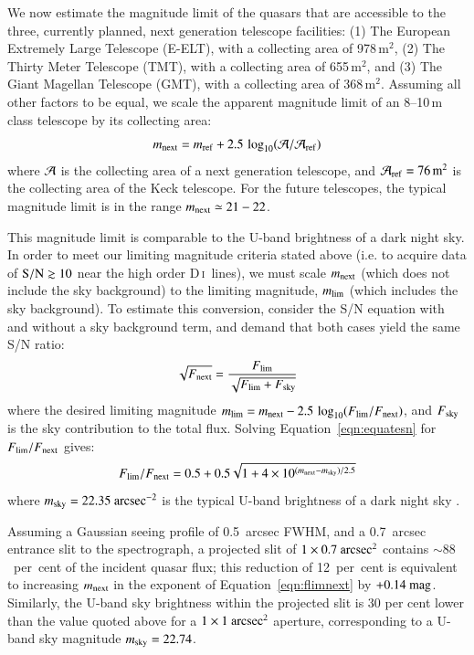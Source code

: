 \documentclass[12pt,preprint,useAMS,usenatbib]{emulateapj}
\newcommand{\DI}{\textrm{D}\,\textsc{i}}
\begin{document}
\begin{appendix}
We now estimate the magnitude limit of the quasars that
are accessible to the three, currently planned,
next generation telescope facilities:
(1) The European Extremely Large Telescope (E-ELT),
with a collecting area of 978\,m$^{2}$,
(2) The Thirty Meter Telescope (TMT),
with a collecting area of 655\,m$^{2}$, and
(3) The Giant Magellan Telescope (GMT),
with a collecting area of 368\,m$^{2}$.
Assuming all other factors to be equal, we scale
the apparent magnitude limit of an 8--10\,m
class telescope by its collecting area:
\begin{equation}
\label{eqn:apgain}
m_{\rm next}=m_{\rm ref} + 2.5\,\log_{10}({\cal A}/{\cal A}_{\rm ref})
\end{equation}
where ${\cal A}$ is the collecting area of a next generation
telescope, and ${\cal A}_{\rm ref}=76\,{\rm m}^{2}$
is the collecting area of the Keck telescope.
For the future telescopes, the typical magnitude
limit is in the range $m_{\rm next}\simeq21 - 22$.

This magnitude limit is comparable to the U-band brightness
of a dark night sky. In order to meet our limiting magnitude
criteria stated above (i.e. to acquire data of ${\rm S/N}\gtrsim10$
near the high order \DI\ lines), we must scale $m_{\rm next}$ (which
does not include the sky background) to the limiting magnitude,
$m_{\rm lim}$ (which includes the sky background). To estimate
this conversion, consider the S/N equation with and without a sky
background term, and demand that both cases yield the same
S/N ratio:
\begin{equation}
\label{eqn:equatesn}
\sqrt{F_{\rm next}} = \frac{F_{\rm lim}}{\sqrt{F_{\rm lim}+F_{\rm sky}}}
\end{equation}
where the desired limiting magnitude
$m_{\rm lim} = m_{\rm next} - 2.5\,\log_{10}(F_{\rm lim}/F_{\rm next})$,
and $F_{\rm sky}$ is the sky contribution to the total flux. Solving
Equation~\ref{eqn:equatesn} for $F_{\rm lim}/F_{\rm next}$ gives:
\begin{equation}
\label{eqn:flimnext}
F_{\rm lim}/F_{\rm next} = 0.5 + 0.5\sqrt{1+ 4\times10^{(m_{\rm next}-m_{\rm sky})/2.5}}
\end{equation}
where $m_{\rm sky}=22.35~{\rm arcsec}^{-2}$ is the typical U-band brightness
of a dark night sky \citep[e.g.][]{Pat08}.

Assuming a Gaussian seeing profile of 0.5~arcsec FWHM, and
a 0.7~arcsec entrance slit to the spectrograph, a projected slit
of $1\times0.7~{\rm arcsec}^{2}$ contains $\sim88$~per~cent
of the incident quasar flux; this reduction of 12~per~cent is
equivalent to increasing $m_{\rm next}$ in the exponent of
Equation~\ref{eqn:flimnext} by $+0.14~{\rm mag}$.
Similarly, the U-band sky brightness within the projected slit is
30 per cent lower than the value quoted above for a
$1\times1~{\rm arcsec}^{2}$ aperture,
corresponding to a U-band sky magnitude
$m_{\rm sky}=22.74$.


\end{appendix}
\end{document}
